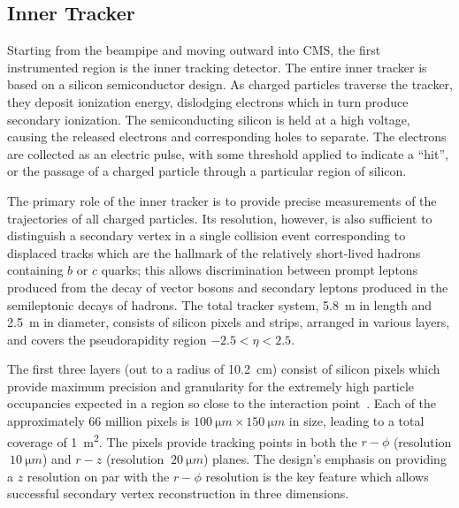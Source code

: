 \subsection{Inner Tracker}

Starting from the beampipe and moving outward into CMS, the first instrumented region is the inner tracking detector.  The entire inner tracker is based on a silicon semiconductor design.  As charged particles traverse the tracker, they deposit ionization energy, dislodging electrons which in turn produce secondary ionization.  The semiconducting silicon is held at a high voltage, causing the released electrons and corresponding holes to separate.  The electrons are collected as an electric pulse, with some threshold applied to indicate a ``hit'', or the passage of a charged particle through a particular region of silicon. 

The primary role of the inner tracker is to provide precise measurements of the trajectories of all charged particles.  Its resolution, however, is also sufficient to distinguish a secondary vertex in a single collision event corresponding to displaced tracks which are the hallmark of the relatively short-lived hadrons containing $b$ or $c$ quarks; this allows discrimination between prompt leptons produced from the decay of vector bosons and secondary leptons produced in the semileptonic decays of hadrons.  The total tracker system, \SI{5.8}{m} in length and \SI{2.5}{m} in diameter, consists of silicon pixels and strips, arranged in various layers, and covers the pseudorapidity region $-2.5<\eta<2.5$.

The first three layers (out to a radius of \SI{10.2}{cm}) consist of silicon pixels which provide maximum precision and granularity for the extremely high particle occupancies expected in a region so close to the interaction point~\cite{Kastli2007724}.  Each of the approximately 66 million pixels is $\SI{100}{\micro m} \times \SI{150}{\micro m}$ in size, leading to a total coverage of \SI{1}{m^2}.  The pixels provide tracking points in both the $r-\phi$ (resolution $~\SI{10}{\micro m}$) and $r-z$ (resolution $~\SI{20}{\micro m}$) planes.  The design's emphasis on providing a $z$ resolution on par with the $r-\phi$ resolution is the key feature which allows successful secondary vertex reconstruction in three dimensions.

